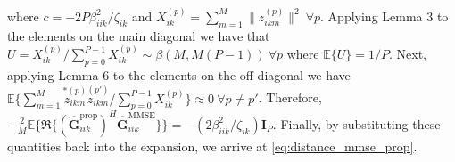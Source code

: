 \documentclass[10pt,journal,comsoc,final]{IEEEtran}
\begin{document}
where $c = -{2P \beta_{iik}^{2}} / {\zeta_{ik}}$ and $X_{ik}^{(p)} = \sum_{m=1}^{M} \lVert z_{ikm}^{(p)} \rVert^{2} \ \forall p$. Applying Lemma 3 to the elements on the main diagonal we have that $U = X_{ik}^{(p)} / \sum_{p=0}^{P-1}{X_{ik}^{(p)}} \sim \beta(M,M(P-1)) \ \forall p$ where $\mathbb{E}\{ U \} = 1/P$. Next, applying Lemma 6 to the elements on the off diagonal we have $\mathbb{E} \{ \sum_{m=1}^{M}{ \overset{*(p)}{{z}_{ikm}} \overset{(p')}{{z}_{ikm}} } / \sum_{p=0}^{P-1}{X_{ik}^{(p)}} \} \approx 0 \ \forall p \neq p'$. Therefore, $-\frac{2}{M}\mathbb{E} \{\mathfrak{R}\{ (\hat{\textbf{G}}_{iik}^{\text{prop}})^{H} \hat{\textbf{G}}_{iik}^{\text{MMSE}} \}\} = -({2 \beta_{iik}^{2}} / {\zeta_{ik}}) \textbf{I}_{P}$. Finally, by substituting these quantities back into the expansion, we arrive at \eqref{eq:distance_mmse_prop}.
\end{document}

